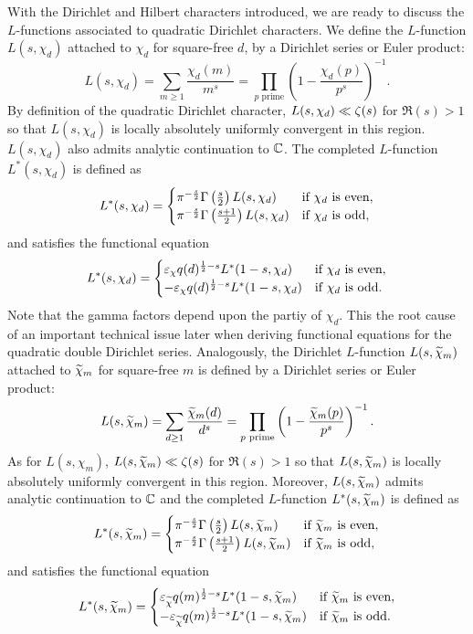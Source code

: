\documentclass[12pt,reqno,oneside]{amsart}
\begin{document}
    With the Dirichlet and Hilbert characters introduced, we are ready to discuss the $L$-functions associated to quadratic Dirichlet characters. We define the $L$-function $L(s,\chi_{d})$ attached to $\chi_{d}$ for square-free $d$, by a Dirichlet series or Euler product:
    \[
        L(s,\chi_{d}) = \sum_{m \ge 1}\frac{\chi_{d}(m)}{m^{s}} = \prod_{p \text{ prime}}\left(1-\frac{\chi_{d}(p)}{p^{s}}\right)^{-1}.
    \]
    By definition of the quadratic Dirichlet character, $L(s,\chi_{d}) \ll \zeta(s)$ for $\Re(s) > 1$ so that $L(s,\chi_{d})$ is locally absolutely uniformly convergent in this region. $L(s,\chi_{d})$ also admits analytic continuation to $\mathbb{C}$. The completed $L$-function $L^{\ast}(s,\chi_{d})$ is defined as
    \[
        L^{\ast}(s,\chi_{d}) = \begin{cases} \pi^{-\frac{s}{2}}\Gamma\left(\frac{s}{2}\right)L(s,\chi_{d}) & \text{if $\chi_{d}$ is even}, \\ \pi^{-\frac{s}{2}}\Gamma\left(\frac{s+1}{2}\right)L(s,\chi_{d}) & \text{if $\chi_{d}$ is odd}, \end{cases}
    \]
    and satisfies the functional equation
    \[
        L^{\ast}(s,\chi_{d}) = \begin{cases} \varepsilon_{\chi}q(d)^{\frac{1}{2}-s}L^{\ast}(1-s,\chi_{d}) & \text{if $\chi_{d}$ is even}, \\ -\varepsilon_{\chi}q(d)^{\frac{1}{2}-s}L^{\ast}(1-s,\chi_{d}) & \text{if $\chi_{d}$ is odd}. \end{cases}
    \]
    Note that the gamma factors depend upon the partiy of $\chi_{d}$. This the root cause of an important technical issue later when deriving functional equations for the quadratic double Dirichlet series. Analogously, the Dirichlet $L$-function $L(s,\widetilde{\chi}_{m})$ attached to $\widetilde{\chi}_{m}$ for square-free $m$ is defined by a Dirichlet series or Euler product:
    \[
        L(s,\widetilde{\chi}_{m}) = \sum_{d \ge 1}\frac{\widetilde{\chi}_{m}(d)}{d^{s}} = \prod_{p \text{ prime}}\left(1-\frac{\widetilde{\chi}_{m}(p)}{p^{s}}\right)^{-1}.
    \]
    As for $L(s,\chi_{m})$, $L(s,\widetilde{\chi}_{m}) \ll \zeta(s)$ for $\Re(s) > 1$ so that $L(s,\widetilde{\chi}_{m})$ is locally absolutely uniformly convergent in this region. Moreover, $L(s,\widetilde{\chi}_{m})$ admits analytic continuation to $\mathbb{C}$ and the completed $L$-function $L^{\ast}(s,\widetilde{\chi}_{m})$ is defined as
    \[
        L^{\ast}(s,\widetilde{\chi}_{m}) = \begin{cases} \pi^{-\frac{s}{2}}\Gamma\left(\frac{s}{2}\right)L(s,\widetilde{\chi}_{m}) & \text{if $\widetilde{\chi}_{m}$ is even}, \\ \pi^{-\frac{s}{2}}\Gamma\left(\frac{s+1}{2}\right)L(s,\widetilde{\chi}_{m}) & \text{if $\widetilde{\chi}_{m}$ is odd}, \end{cases}
    \]
    and satisfies the functional equation
    \[
        L^{\ast}(s,\widetilde{\chi}_{m}) = \begin{cases} \varepsilon_{\widetilde{\chi}}q(m)^{\frac{1}{2}-s}L^{\ast}(1-s,\widetilde{\chi}_{m}) & \text{if $\widetilde{\chi}_{m}$ is even}, \\ -\varepsilon_{\widetilde{\chi}}q(m)^{\frac{1}{2}-s}L^{\ast}(1-s,\widetilde{\chi}_{m}) & \text{if $\widetilde{\chi}_{m}$ is odd}. \end{cases}
    \]
\end{document}
